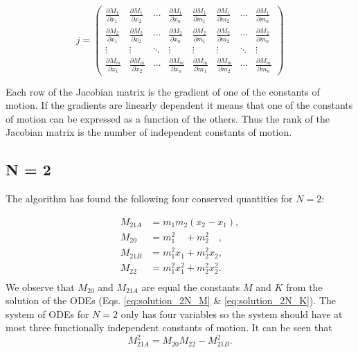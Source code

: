 \documentclass[english,master]{liumaiex}
\theoremstyle{plain}
\theoremstyle{definition}
\begin{document}
\begin{equation}
	j = 
	\begin{pmatrix}
		\frac{\partial M_1}{\partial x_1} & \frac{\partial M_1}{\partial x_2} & \cdots & \frac{\partial M_1}{\partial x_n} & \frac{\partial M_1}{\partial m_1} & \frac{\partial M_1}{\partial m_2} & \cdots & \frac{\partial M_1}{\partial m_n} \\
		\frac{\partial M_2}{\partial x_1} & \frac{\partial M_2}{\partial x_2} & \cdots & \frac{\partial M_2}{\partial x_n} & \frac{\partial M_2}{\partial m_1} & \frac{\partial M_2}{\partial m_2} & \cdots & \frac{\partial M_2}{\partial m_n} \\
		\vdots & \vdots & \ddots & \vdots & \vdots & \vdots & \ddots & \vdots \\
		\frac{\partial M_m}{\partial x_1} & \frac{\partial M_m}{\partial x_2} & \cdots & \frac{\partial M_m}{\partial x_n} & \frac{\partial M_m}{\partial m_1} & \frac{\partial M_m}{\partial m_2} & \cdots & \frac{\partial M_m}{\partial m_n}
	\end{pmatrix}
\end{equation}

Each row of the Jacobian matrix is the gradient of one of the constants of motion. If the gradients are linearly dependent it means that one of the constants of motion can be expressed as a function of the others. Thus the rank of the Jacobian matrix is the number of independent constants of motion.


\subsection*{N = 2}

The algorithm has found the following four conserved quantities for $N = 2$:

\begin{align}
	M_{21A} &= m_1 m_2 (x_2 - x_1), \\
	M_{20\phantom{A}} &= m_1^2\phantom{x_1} + m_2^2\phantom{x_2}, \\
	M_{21B} &= m_1^2 x_1 + m_2^2 x_2, \\
	M_{22\phantom{A}} &= m_1^2 x_1^2 + m_2^2 x_2^2. \\
\end{align}
%
We observe that $M_{20}$ and $M_{21A}$ are equal the constants $M$ and $K$ from the solution of the ODEs (Eqs. \ref{eq:solution_2N_M} \& \ref{eq:solution_2N_K}).
%
The system of ODEs for $N = 2$ only has four variables so the system should have at most three functionally independent constants of motion. It can be seen that
\begin{equation}
	M_{21A}^2 = M_{20}M_{22} - M_{21B}^2.
\end{equation}
\end{document}
